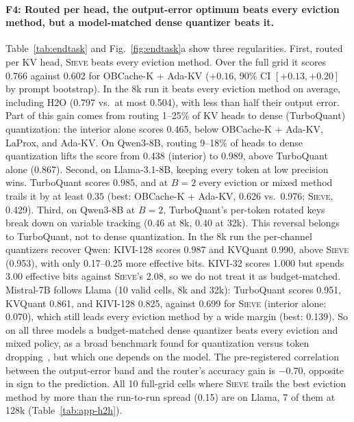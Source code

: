 \documentclass{article}
\newif\ifshowtbd \showtbdtrue
\newcommand{\tbd}[1]{\ifshowtbd{\color{tbdcol}\textbf{TBD}~#1}\else\ifhmode\unskip\fi\fi}
\newcommand{\sieve}{\textsc{Sieve}}
\theoremstyle{definition}
\begin{document}

\paragraph{F4: Routed per head, the output-error optimum beats every eviction method, but a model-matched dense quantizer beats it.}
Table~\ref{tab:endtask} and Fig.~\ref{fig:endtask}a show three regularities.  First, routed per KV head, \sieve{} beats every eviction method.  Over the full grid it scores 0.766 against 0.602 for OBCache-K + Ada-KV ($+0.16$, 90\% CI $[+0.13,+0.20]$ by prompt bootstrap).  In the 8k run it beats every eviction method on average, including H2O (0.797 vs.\ at most 0.504), with less than half their output error.  Part of this gain comes from routing 1--25\% of KV heads to dense (TurboQuant) quantization: the interior alone scores 0.465, below OBCache-K + Ada-KV, LaProx, and Ada-KV.  On Qwen3-8B, routing 9--18\% of heads to dense quantization lifts the score from 0.438 (interior) to 0.989, above TurboQuant alone (0.867).  Second, on Llama-3.1-8B, keeping every token at low precision wins.  TurboQuant scores 0.985, and at $B=2$ every eviction or mixed method trails it by at least $0.35$ (best: OBCache-K + Ada-KV, 0.626 vs.\ 0.976; \sieve{}, 0.429).  Third, on Qwen3-8B at $B=2$, TurboQuant's per-token rotated keys break down on variable tracking ($0.46$ at 8k, $0.40$ at 32k).  This reversal belongs to TurboQuant, not to dense quantization.  In the 8k run the per-channel quantizers recover Qwen: KIVI-128 scores 0.987 and KVQuant 0.990, above \sieve{} (0.953), with only 0.17--0.25 more effective bits.  KIVI-32 scores 1.000 but spends 3.00 effective bits against \sieve{}'s 2.08, so we do not treat it as budget-matched.  Mistral-7B follows Llama (10 valid cells, 8k and 32k): TurboQuant scores 0.951, KVQuant 0.861, and KIVI-128 0.825, against 0.699 for \sieve{} (interior alone: 0.070), which still leads every eviction method by a wide margin (best: 0.139).  So on all three models a budget-matched dense quantizer beats every eviction and mixed policy, as a broad benchmark found for quantization versus token dropping~\citep{yuan2024kvbench}, but which one depends on the model.  The pre-registered correlation between the output-error band and the router's accuracy gain is $-0.70$, opposite in sign to the prediction.  All 10 full-grid cells where \sieve{} trails the best eviction method by more than the run-to-run spread (0.15) are on Llama, 7 of them at 128k (Table~\ref{tab:app-h2h}).
\end{document}
